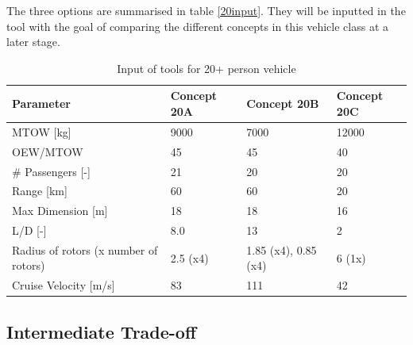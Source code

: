 The three options are summarised in table \autoref{20input}. They will be inputted in the tool with the goal of comparing the different concepts in this vehicle class at a later stage. 

\begin{table}[H]
\captionsetup{justification=centering}
\caption{Input of tools for 20+ person vehicle}
\label{20input}
\begin{tabular}{@{}llll@{}}
\toprule
\textbf{Parameter}                       & \textbf{Concept 20A} & \textbf{Concept 20B} & \textbf{Concept 20C} \\ \midrule
MTOW {[}kg{]}                            &    9000                &       7000             &  12000                  \\
OEW/MTOW           &        45            &           45         &      40              \\
\# Passengers {[}-{]}                    &        21            &        20            &       20             \\
Range {[}km{]}                           &        60            &        60            &           20         \\
Max Dimension {[}m{]}                    &          18         &        18            &          16          \\
L/D {[}-{]}                              &         8.0           &        13            &     2               \\
Radius of rotors (x number of rotors)  &           2.5 (x4)         &   1.85 (x4), 0.85 (x4)                 &     6 (1x)               \\
Cruise Velocity {[}m/s{]}                &          83          &        111           &  42                 \\ \bottomrule
\end{tabular}

\end{table}


\subsection{Intermediate Trade-off}

